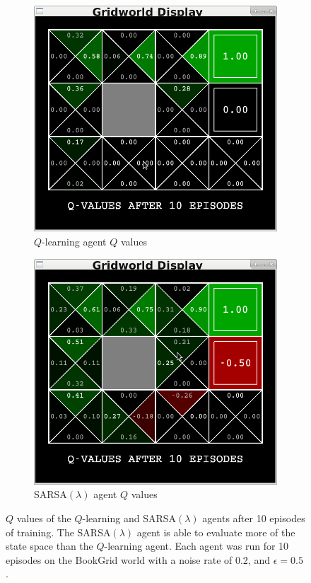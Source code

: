 \documentclass[10pt,conference]{IEEEtran}
\begin{document}
	\begin{figure}[h]
		\centering
		\begin{subfigure}[b]{0.25\textwidth}
			\includegraphics[width=\textwidth]{./images/qlearning_gridworld_10}
			\caption{\(Q\)-learning agent \(Q\) values}
		\end{subfigure}%
		\begin{subfigure}[b]{0.25\textwidth}
			\includegraphics[width=\textwidth]{./images/sarsa_gridworld_10}
			\caption{SARSA\((\lambda)\) agent \(Q\) values}
		\end{subfigure}
		\caption{\(Q\) values of the \(Q\)-learning and SARSA\((\lambda)\) agents 
		after 10 episodes of training.  The SARSA\((\lambda)\) agent is able
		to evaluate more of the state space than the \(Q\)-learning agent.
		Each agent was run for 10 episodes on the BookGrid world with a noise
		rate of 0.2, and \(\epsilon = 0.5\).}
		\label{qvalues}
	\end{figure}
\end{document}
